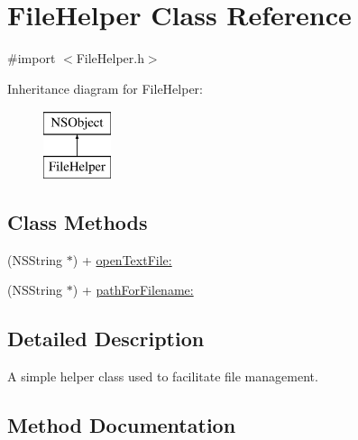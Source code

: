 \hypertarget{interface_file_helper}{}\section{File\+Helper Class Reference}
\label{interface_file_helper}


{\ttfamily \#import $<$File\+Helper.\+h$>$}

Inheritance diagram for File\+Helper\+:\begin{figure}[H]
\begin{center}
\leavevmode
\includegraphics[height=2.000000cm]{interface_file_helper}
\end{center}
\end{figure}
\subsection*{Class Methods}
\begin{DoxyCompactItemize}
\item 
(N\+S\+String $\ast$) + \hyperlink{interface_file_helper_a34aa2af0292b8653b8a9d4dded1ee606}{open\+Text\+File\+:}
\item 
(N\+S\+String $\ast$) + \hyperlink{interface_file_helper_a7f41f6c61383d3173a885964c8910801}{path\+For\+Filename\+:}
\end{DoxyCompactItemize}


\subsection{Detailed Description}
A simple helper class used to facilitate file management. 

\subsection{Method Documentation}
\hypertarget{interface_file_helper_a34aa2af0292b8653b8a9d4dded1ee606}{}
